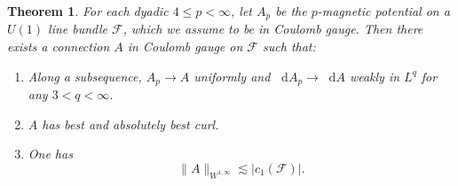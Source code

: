\documentclass[reqno,11pt]{amsart}
\newcommand*\dif{\mathop{}\!\mathrm{d}}
\newtheorem{theorem}{Theorem}[section]
\theoremstyle{definition}
\numberwithin{equation}{section}
\begin{document}
\begin{theorem}\label{existence infinity}
For each dyadic $4 \leq p < \infty$, let $A_p$ be the $p$-magnetic potential on a $U(1)$ line bundle $\mathscr F$, which we assume to be in Coulomb gauge.
Then there exists a connection $A$ in Coulomb gauge on $\mathscr F$ such that:
\begin{enumerate}
\item Along a subsequence, $A_p \to A$ uniformly and $\dif A_p \to \dif A$ weakly in $L^q$ for any $3 < q < \infty$.
\item $A$ has best and absolutely best curl.
\item One has 
\begin{equation}\label{Sobolev bounds for infinity}
	\|A\|_{W^{1, \infty}} \lesssim |c_1(\mathscr F)|.
\end{equation}
\end{enumerate}
\end{theorem}
\end{document}
